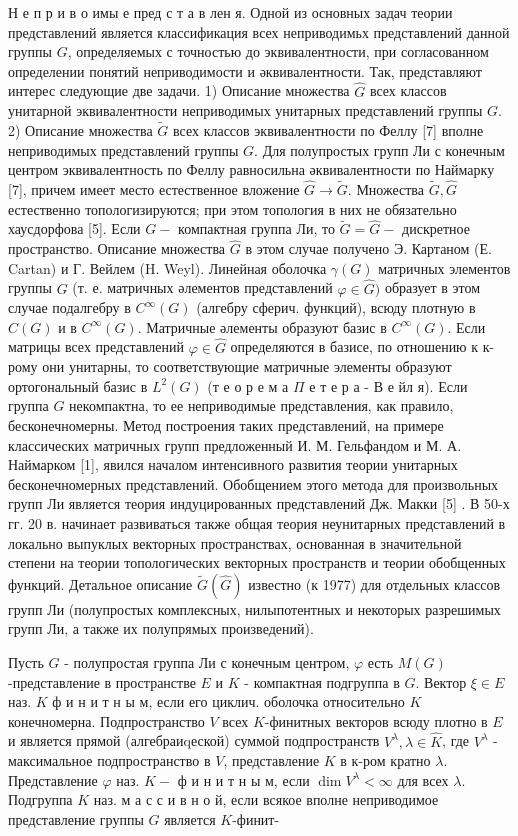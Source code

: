 \documentclass[10pt]{article}
\begin{document}
Н е п р и в о имы е пред с т а в лен я. Одной из основных задач теории представлений является классификация всех неприводимьх представлений данной группы $G$, определяемых с точностью до эквивалентности, при согласованном определении понятий неприводимости и әквивалентности. Так, представляют интерес следующие две задачи. 1) Описание множества $\widehat{G}$ всех классов унитарной эквивалентности неприводимых унитарных представлений группы $G$. 2) Описание множества $\tilde{G}$ всех классов эквивалентности по Феллу [7] вполне неприводимых представлений группы $G$. Для полупростых групп Ли с конечным центром эквивалентность по Феллу равносильна әквивалентности по Наймарку [7], причем имеет место естественное вложение $\widehat{G} \rightarrow \tilde{G}$. Множества $\tilde{G}, \widehat{G}$ естественно топологизируются; при этом топология в них не обязательно хаусдорфова [5]. Если $G-$ компактная группа Ли, то $\widetilde{G}=\widehat{G}-$ дискретное пространство. Описание множества $\widehat{G}$ в этом случае получено Э. Картаном (Е. Cartan) и Г. Вейлем (H. Weyl). Линейная оболочка $\gamma(G)$ матричных элементов группы $G$ (т. е. матричных әлементов представлений $\varphi \in \widehat{G})$ образует в этом случае подалгебру в $C^{\infty}(G)$ (алгебру сферич. функций), всюду плотную в $C(G)$ и в $C^{\infty}(G)$. Матричные әлементы образуют базис в $C^{\infty}(G)$. Если матрицы всех представлений $\varphi \in \widehat{G}$ определяются в базисе, по отношению к к-рому они унитарны, то соответствующие матричные элементы образуют ортогональный базис в $L^{2}(G)$ (т е о р е м а $\Pi$ е т е р а - В е йл я). Если группа $G$ некомпактна, то ее неприводимые представления, как правило, бесконечномерны. Метод построения таких представлений, на примере классических матричных групп предложенный И. М. Гельфандом и М. А. Наймарком [1], явился началом интенсивного развития теории унитарных бесконечномерных представлений. Обобщением этого метода для произвольных групп Ли является теория индуцированных представлений Дж. Макки [5] . В 50-х гг. 20 в. начинает развиваться также общая теория неунитарных представлений в локально выпуклых векторных пространствах, основанная в значительной степени на теории топологических векторных пространств и теории обобщенных функций. Детальное описание $\tilde{G}(\widehat{G})$ известно (к 1977) для отдельных классов групп Ли (полупростых комплексных, нилыпотентных и некоторых разрешимых групп Ли, а также их полупрямых произведений).



Пусть $G$ - полупростая группа Ли с конечным центром, $\varphi$ есть $M(G)$-представление в пространстве $E$ и $K$ - компактная подгруппа в $G$. Вектор $\xi \in E$ наз. $K$ ф и н и т н ы м, если его циклич. оболочка относительно $K$ конечномерна. Подпространство $V$ всех $K$-финитных векторов всюду плотно в $E$ и является прямой (алгебраиqеской) суммой подпространств $V^{\lambda}, \lambda \in \widehat{K}$, где $V^{\lambda}$ - максимальное подпространство в $V$, представление $K$ в к-ром кратно $\lambda$. Представление $\varphi$ наз. $K-$ $ф$ и н и т н ы м, если $\operatorname{dim} V^{\lambda}<\infty$ для всех $\lambda$. Подгруппа $K$ наз. м а с с и в н о й, если всякое вполне неприводимое представление группы $G$ является $K$-финит-
\end{document}
